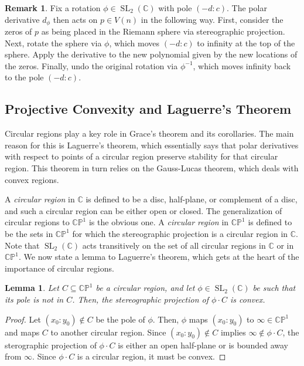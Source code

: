 \documentclass{article}
\newtheorem{lemma}[theorem]{Lemma}
\theoremstyle{definition}
\newtheorem{remark}[theorem]{Remark}
\theoremstyle{plain}
\newcommand{\C}{\mathbb{C}}
\newcommand{\CP}{\mathbb{CP}}
\DeclareMathOperator{\SL}{SL}
\begin{document}
\begin{remark}
    Fix a rotation $\phi \in \SL_2(\C)$ with pole $(-d:c)$. The polar derivative $d_\phi$ then acts on $p \in V(n)$ in the following way. First, consider the zeros of $p$ as being placed in the Riemann sphere via stereographic projection. Next, rotate the sphere via $\phi$, which moves $(-d:c)$ to infinity at the top of the sphere. Apply the derivative to the new polynomial given by the new locations of the zeros. Finally, undo the original rotation via $\phi^{-1}$, which moves infinity back to the pole $(-d:c)$.
\end{remark}

\subsection{Projective Convexity and Laguerre's Theorem}\label{proj_conv_subsect}

Circular regions play a key role in Grace's theorem and its corollaries. The main reason for this is Laguerre's theorem, which essentially says that polar derivatives with respect to points of a circular region preserve stability for that circular region. This theorem in turn relies on the Gauss-Lucas theorem, which deals with convex regions. 

A \emph{circular region} in $\C$ is defined to be a disc, half-plane, or complement of a disc, and such a circular region can be either open or closed. The generalization of circular regions to $\CP^1$ is the obvious one. A \emph{circular region} in $\CP^1$ is defined to be the sets in $\CP^1$ for which the stereographic projection is a circular region in $\C$. Note that $\SL_2(\C)$ acts transitively on the set of all circular regions in $\C$ or in $\CP^1$. We now state a lemma to Laguerre's theorem, which gets at the heart of the importance of circular regions.

\begin{lemma}
    Let $C \subseteq \CP^1$ be a circular region, and let $\phi \in \SL_2(\C)$ be such that its pole is not in $C$. Then, the stereographic projection of $\phi \cdot C$ is convex.
\end{lemma}
\begin{proof}
    Let $(x_0:y_0) \notin C$ be the pole of $\phi$. Then, $\phi$ maps $(x_0:y_0)$ to $\infty \in \CP^1$ and maps $C$ to another circular region. Since $(x_0:y_0) \notin C$ implies $\infty \notin \phi \cdot C$, the sterographic projection of $\phi \cdot C$ is either an open half-plane or is bounded away from $\infty$. Since $\phi \cdot C$ is a circular region, it must be convex.
\end{proof}
\end{document}
